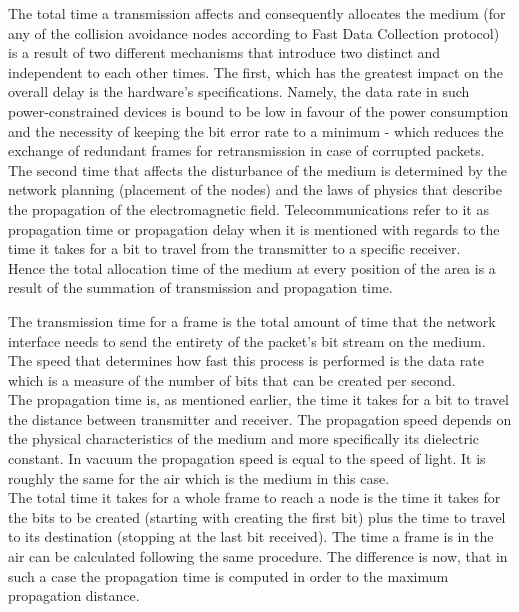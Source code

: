 The total time a transmission affects and consequently allocates the medium (for any of the collision avoidance nodes according to Fast Data Collection protocol) is a result of two different mechanisms that introduce two distinct and independent to each other times. The first, which has the greatest impact on the overall delay is the hardware's specifications. Namely, the data rate in such power-constrained devices is bound to be low in favour of the power consumption and the necessity of keeping the bit error rate to a minimum - which reduces the exchange of redundant frames for retransmission in case of corrupted packets. The second time that affects the disturbance of the medium is determined by the network planning (placement of the nodes) and the laws of physics that describe the propagation of the electromagnetic field. Telecommunications refer to it as propagation time or propagation delay when it is mentioned with regards to the time it takes for a bit to travel from the transmitter to a specific receiver.
\\Hence the total allocation time of the medium at every position of the area is a result of the summation of transmission and propagation time.


The transmission time for a frame is the total amount of time that the network interface needs to send the entirety of the packet's bit stream on the medium. The speed that determines how fast this process is performed is the data rate which is a measure of the number of bits that can be created per second.\\
The propagation time is, as mentioned earlier, the time it takes for a bit to travel the distance between transmitter and receiver. The propagation speed depends on the physical characteristics of the medium and more specifically its dielectric constant. In vacuum the propagation speed is equal to the speed of light. It is roughly the same for the air which is the medium in this case.\\
The total time it takes for a whole frame to reach a node is the time it takes for the bits to be created (starting with creating the first bit) plus the time to travel to its destination (stopping at the last bit received). The time a frame is in the air can be calculated following the same procedure. The difference is now, that in such a case the propagation time is computed in order to the maximum propagation distance.

